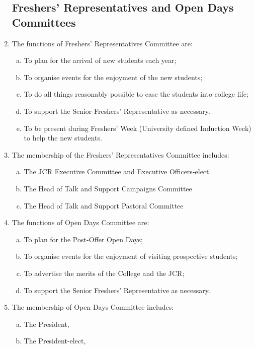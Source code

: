 \documentclass[12pt]{article}
\begin{document}
\begin{enumerate}
    \subsection{Freshers' Representatives and Open Days Committees}
    \item The functions of Freshers' Representatives Committee are:
    \begin{enumerate}[(a)]
        \item To plan for the arrival of new students each year;
        \item To organise events for the enjoyment of the new students;
        \item To do all things reasonably possible to ease the students into college life;
        \item To support the Senior Freshers' Representative as necessary.
        \item To be present during Freshers' Week (University defined Induction Week) to help the new students.
    \end{enumerate}
    \item The membership of the Freshers' Representatives Committee includes:
    \begin{enumerate}[(a)]
        \item The JCR Executive Committee and Executive Officers-elect
        \item The Head of Talk and Support Campaigns Committee
        \item The Head of Talk and Support Pastoral Committee
    \end{enumerate}
    \item The functions of Open Days Committee are:
    \begin{enumerate}[(a)]
        \item To plan for the Post-Offer Open Days;
        \item To organise events for the enjoyment of visiting prospective students;
        \item To advertise the merits of the College and the JCR;
        \item To support the Senior Freshers' Representative as necessary.
    \end{enumerate}
    \item The membership of Open Days Committee includes:
    \begin{enumerate}[(a)]
        \item The President,
        \item The President-elect,

\end{enumerate}
\end{enumerate}
\end{document}
